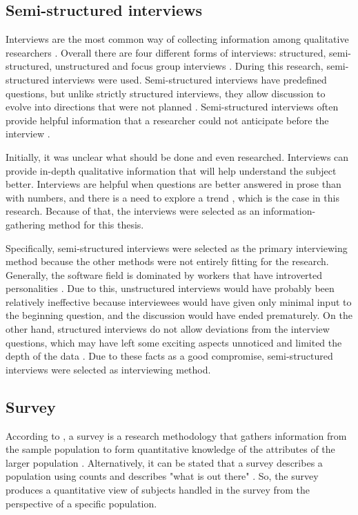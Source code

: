 \subsection{Semi-structured interviews}
Interviews are the most common way of collecting information among qualitative researchers \cite{cassell2005creating}. Overall there are four different forms of interviews: structured, semi-structured, unstructured and focus group interviews \cite{alsaawi2014critical}. During this research, semi-structured interviews were used. Semi-structured interviews have predefined questions, but unlike strictly structured interviews, they allow discussion to evolve into directions that were not planned \cite{alsaawi2014critical}. Semi-structured interviews often provide helpful information that a researcher could not anticipate before the interview \cite{raworth2012conducting}.

Initially, it was unclear what should be done and even researched. Interviews can provide in-depth qualitative information that will help understand the subject better. Interviews are helpful when questions are better answered in prose than with numbers, and there is a need to explore a trend \cite{beck2008practical}, which is the case in this research. Because of that, the interviews were selected as an information-gathering method for this thesis.

Specifically, semi-structured interviews were selected as the primary interviewing method because the other methods were not entirely fitting for the research. Generally, the software field is dominated by workers that have introverted personalities \cite{capretz2003personality}. Due to this, unstructured interviews would have probably been relatively ineffective because interviewees would have given only minimal input to the beginning question, and the discussion would have ended prematurely. On the other hand, structured interviews do not allow deviations from the interview questions, which may have left some exciting aspects unnoticed and limited the depth of the data \cite{alsaawi2014critical}. Due to these facts as a good compromise, semi-structured interviews were selected as interviewing method.

\subsection{Survey}
According to \citeauthor{groves2011survey}, a survey is a research methodology that gathers information from the sample population to form quantitative knowledge of the attributes of the larger population \cite{groves2011survey}. Alternatively, it can be stated that a survey describes a population using counts and describes "what is out there" \cite{sapsford2006survey}. So, the survey produces a quantitative view of subjects handled in the survey from the perspective of a specific population.

